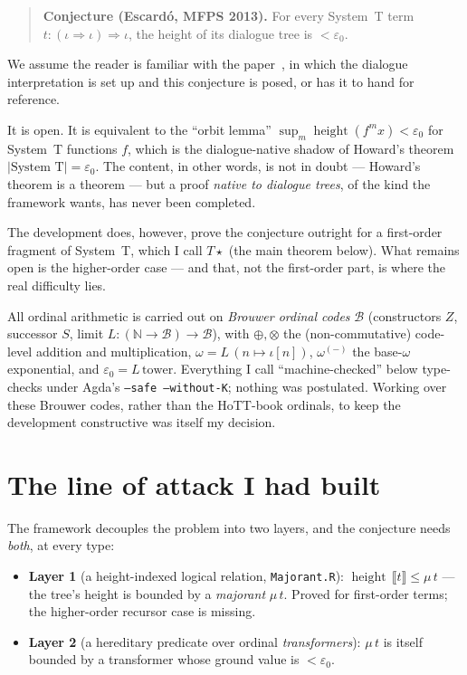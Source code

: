 \documentclass[11pt]{article}
\newcommand{\eps}{\varepsilon_0}
\newcommand{\N}{\mathbb{N}}
\newcommand{\B}{\mathcal{B}}
\newcommand{\height}{\operatorname{height}}
\newcommand{\code}[1]{\texttt{#1}}
\newcommand{\ii}{\iota}
\newcommand{\arr}{\Rightarrow}
\theoremstyle{definition}
\begin{document}
\begin{quote}
\textbf{Conjecture (Escardó, MFPS 2013).} For every System~T term
$t:(\ii\arr\ii)\arr\ii$, the height of its dialogue tree is $<\eps$.
\end{quote}

We assume the reader is familiar with the paper~\cite{escardo-mfps}, in which
the dialogue interpretation is set up and this conjecture is posed, or has it to
hand for reference.

It is open. It is equivalent to the ``orbit lemma''
$\sup_m \height(f^m x) < \eps$ for System~T functions $f$, which is the
dialogue-native shadow of Howard's theorem $|\text{System T}| = \eps$. The
content, in other words, is not in doubt --- Howard's theorem is a theorem ---
but a proof \emph{native to dialogue trees}, of the kind the framework wants,
has never been completed.

The development does, however, prove the conjecture outright for a first-order
fragment of System~T, which I call $T\star$ (the main theorem below).
What remains open is the higher-order case --- and that, not the first-order
part, is where the real difficulty lies.

All ordinal arithmetic is carried out on \emph{Brouwer ordinal codes} $\B$
(constructors $Z$, successor $S$, limit $L : (\N\to\B)\to\B$), with
$\oplus,\otimes$ the (non-commutative) code-level addition and multiplication,
$\omega = L\,(n\mapsto \iota[n])$, $\omega^{(-)}$ the base-$\omega$ exponential,
and $\eps = L\,\mathrm{tower}$. Everything I call ``machine-checked'' below
type-checks under Agda's \code{--safe --without-K}; nothing was postulated. Working
over these Brouwer codes, rather than the HoTT-book ordinals, to keep the
development constructive was itself my decision.

\section{The line of attack I had built}

The framework decouples the problem into two layers, and the conjecture needs
\emph{both}, at every type:
\begin{itemize}
\item \textbf{Layer 1} (a height-indexed logical relation, \code{Majorant.R}):
  $\height\,\llbracket t\rrbracket \le \mu\,t$ --- the tree's height is bounded
  by a \emph{majorant} $\mu\,t$. Proved for first-order terms; the
  higher-order recursor case is missing.
\item \textbf{Layer 2} (a hereditary predicate over ordinal
  \emph{transformers}): $\mu\,t$ is itself bounded by a transformer whose
  ground value is $<\eps$.
\end{itemize}
\end{document}

